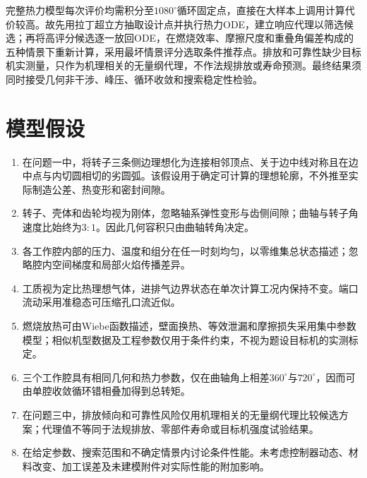 \documentclass[withoutpreface,bwprint]{cumcmthesis}
\begin{document}
完整热力模型每次评价均需积分至$1080^\circ$循环固定点，直接在大样本上调用计算代价较高。故先用拉丁超立方抽取设计点并执行热力ODE，建立响应代理以筛选候选；再将高评分候选逐一放回ODE，在燃烧效率、摩擦尺度和重叠角偏差构成的五种情景下重新计算，采用最坏情景评分选取条件推荐点。排放和可靠性缺少目标机实测量，只作为机理相关的无量纲代理，不作法规排放或寿命预测。最终结果须同时接受几何非干涉、峰压、循环收敛和搜索稳定性检验。

\section{模型假设}
\begin{enumerate}[label=\textbf{A\arabic*:},leftmargin=4.4em,labelsep=0.6em]
 \item 在问题一中，将转子三条侧边理想化为连接相邻顶点、关于边中线对称且在边中点与内切圆相切的劣圆弧。该假设用于确定可计算的理想轮廓，不外推至实际制造公差、热变形和密封间隙。
 \item 转子、壳体和齿轮均视为刚体，忽略轴系弹性变形与齿侧间隙；曲轴与转子角速度比始终为$3:1$。因此几何容积只由曲轴转角决定。
 \item 各工作腔内部的压力、温度和组分在任一时刻均匀，以零维集总状态描述；忽略腔内空间梯度和局部火焰传播差异。
 \item 工质视为定比热理想气体，进排气边界状态在单次计算工况内保持不变。端口流动采用准稳态可压缩孔口流近似。
 \item 燃烧放热可由Wiebe函数描述，壁面换热、等效泄漏和摩擦损失采用集中参数模型；相似机型数据及工程参数仅用于条件约束，不视为题设目标机的实测标定。
 \item 三个工作腔具有相同几何和热力参数，仅在曲轴角上相差$360^\circ$与$720^\circ$，因而可由单腔收敛循环错相叠加得到总转矩。
 \item 在问题三中，排放倾向和可靠性风险仅用机理相关的无量纲代理比较候选方案；代理值不等同于法规排放、零部件寿命或目标机强度试验结果。
 \item 在给定参数、搜索范围和不确定情景内讨论条件性能。未考虑控制器动态、材料改变、加工误差及未建模附件对实际性能的附加影响。
\end{enumerate}
\end{document}
